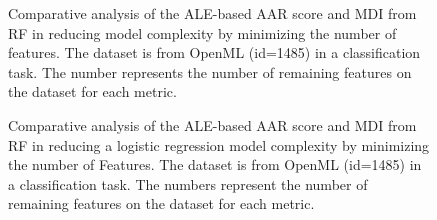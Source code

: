 \begin{figure}[ht!]
\centering
  \caption{Comparative analysis of the ALE-based AAR score and MDI from RF in reducing model complexity by minimizing the number of features. The dataset is from OpenML (id=1485) in a classification task. The number represents the number of remaining features on the dataset for each metric.}
    \label{fig:opemML312}
\end{figure}

\begin{figure}[ht!]
\centering
  \caption{Comparative analysis of the ALE-based AAR score and MDI from RF in reducing a logistic regression model complexity by minimizing the number of Features. The dataset is from OpenML (id=1485) in a classification task. The numbers represent the number of remaining features on the dataset for each metric.}
    \label{fig:opemML312_lr}
\end{figure}




